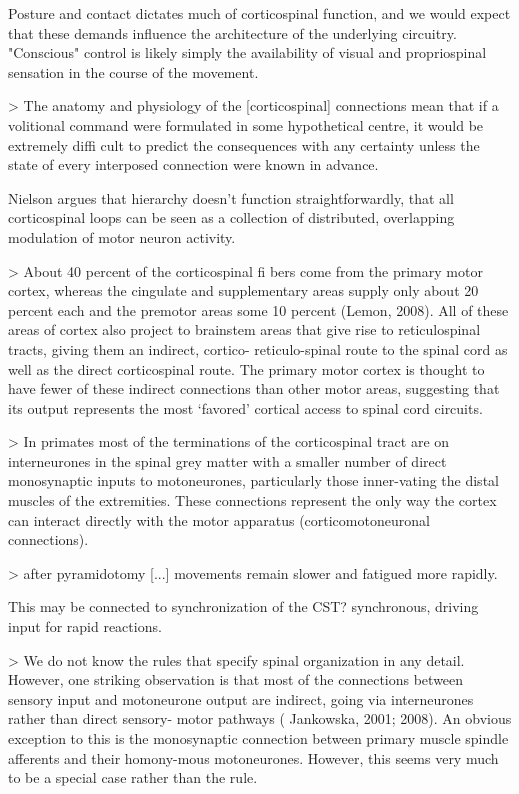 \documentclass[../main.tex]{subfiles}
\begin{document}
{{{Posture and contact dictates much of corticospinal function, and we would expect that these demands influence the architecture of the underlying circuitry. "Conscious" control is likely simply the availability of visual and propriospinal sensation in the course of the movement.

> The  anatomy  and  physiology  of  the  [corticospinal] connections  mean  that  if  a  volitional  command were formulated in some hypothetical centre, it would be extremely diffi cult to predict the consequences with any certainty unless the state of every interposed connection were known in advance.

Nielson argues that hierarchy doesn't function straightforwardly, that all corticospinal loops can be seen as a collection of distributed, overlapping modulation of motor neuron activity.

> About 40 percent of the corticospinal fi bers come from the primary motor cortex, whereas the cingulate and supplementary areas supply only about 20 percent each and the premotor areas some 10 percent (Lemon, 2008). All of these areas of cortex also project to brainstem areas that give rise to reticulospinal tracts, giving them an indirect, cortico- reticulo-spinal route to the spinal cord as well as the direct corticospinal  route.  The  primary  motor  cortex  is  thought  to  have  fewer  of  these  indirect  connections than other motor areas, suggesting that its output represents the most ‘favored’ cortical access to spinal cord circuits.

> In primates most of the terminations of the corticospinal tract are on interneurones in the spinal grey matter with a smaller number of direct monosynaptic inputs to motoneurones, particularly those inner-vating the distal muscles of the extremities. These connections represent the only way the cortex can interact directly with the motor apparatus (corticomotoneuronal connections).

> after pyramidotomy [...] movements remain slower and fatigued more rapidly. 

This may be connected to synchronization of the CST? synchronous, driving input for rapid reactions.

> We  do  not  know  the  rules  that  specify  spinal  organization in any detail. However, one striking observation is that most of the connections between sensory input and motoneurone output are indirect, going via interneurones rather than direct sensory- motor pathways ( Jankowska, 2001; 2008). An obvious exception to this is the  monosynaptic  connection  between  primary  muscle  spindle  afferents  and  their  homony-mous motoneurones. However, this seems very much to be a special case rather than the rule. 

}}}
\end{document}
